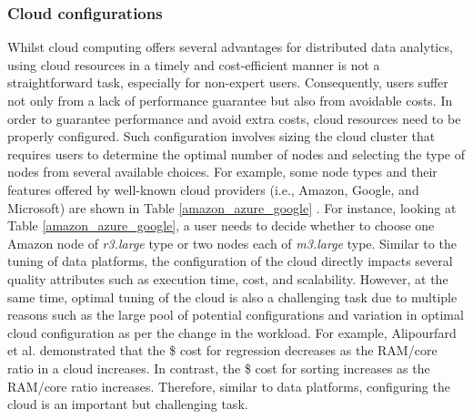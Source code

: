 \documentclass[3p]{elsarticle}
\begin{document}
\subsubsection{Cloud configurations}
Whilst cloud computing offers several advantages for distributed data analytics, using cloud resources in a timely and cost-efficient manner is not a straightforward task, especially for non-expert users. Consequently, users suffer not only from a lack of performance guarantee but also from avoidable costs. In order to guarantee performance and avoid extra costs, cloud resources need to be properly configured. Such configuration involves sizing the cloud cluster that requires users to determine the optimal number of nodes and selecting the type of nodes from several available choices. For example, some node types and their features offered by well-known cloud providers (i.e., Amazon, Google, and Microsoft) are shown in Table \ref{amazon_azure_google} \cite{amazon_azure_google_ref}. For instance, looking at Table \ref{amazon_azure_google}, a user needs to decide whether to choose one Amazon node of \textit{r3.large} type or two nodes each of \textit{m3.large} type. Similar to the tuning of data platforms, the configuration of the cloud directly impacts several quality attributes such as execution time, cost, and scalability. However, at the same time, optimal tuning of the cloud is also a challenging task due to multiple reasons such as the large pool of potential configurations and variation in optimal cloud configuration as per the change in the workload. For example, Alipourfard et al. \cite{alipourfard2017cherrypick} demonstrated that the \$ cost for regression decreases as the RAM/core ratio in a cloud increases. In contrast, the \$ cost for sorting increases as the RAM/core ratio increases. Therefore, similar to data platforms, configuring the cloud is an important but challenging task.
\end{document}

